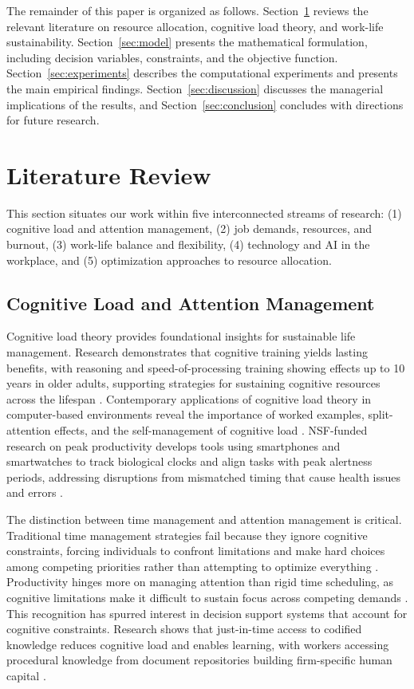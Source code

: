 The remainder of this paper is organized as follows. Section~\ref{sec:literature} reviews the relevant literature on resource allocation, cognitive load theory, and work-life sustainability. Section~\ref{sec:model} presents the mathematical formulation, including decision variables, constraints, and the objective function. Section~\ref{sec:experiments} describes the computational experiments and presents the main empirical findings. Section~\ref{sec:discussion} discusses the managerial implications of the results, and Section~\ref{sec:conclusion} concludes with directions for future research.

\section{Literature Review}\label{sec:literature}

This section situates our work within five interconnected streams of research: (1) cognitive load and attention management, (2) job demands, resources, and burnout, (3) work-life balance and flexibility, (4) technology and AI in the workplace, and (5) optimization approaches to resource allocation.

\subsection{Cognitive Load and Attention Management}

Cognitive load theory provides foundational insights for sustainable life management. Research demonstrates that cognitive training yields lasting benefits, with reasoning and speed-of-processing training showing effects up to 10 years in older adults, supporting strategies for sustaining cognitive resources across the lifespan \citep{NIA2014}. Contemporary applications of cognitive load theory in computer-based environments reveal the importance of worked examples, split-attention effects, and the self-management of cognitive load \citep{ayres_something_2020}. NSF-funded research on peak productivity develops tools using smartphones and smartwatches to track biological clocks and align tasks with peak alertness periods, addressing disruptions from mismatched timing that cause health issues and errors \citep{Lefkowitz2018}.

The distinction between time management and attention management is critical. Traditional time management strategies fail because they ignore cognitive constraints, forcing individuals to confront limitations and make hard choices among competing priorities rather than attempting to optimize everything \citep{Hart2024}. Productivity hinges more on managing attention than rigid time scheduling, as cognitive limitations make it difficult to sustain focus across competing demands \citep{Grant2019}. This recognition has spurred interest in decision support systems that account for cognitive constraints. Research shows that just-in-time access to codified knowledge reduces cognitive load and enables learning, with workers accessing procedural knowledge from document repositories building firm-specific human capital \citep{subramani_capability_2021}.

